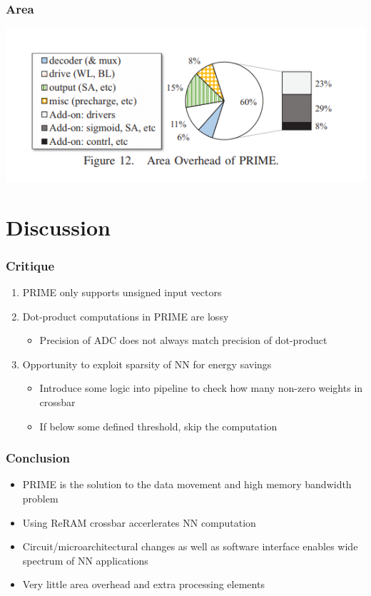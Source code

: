 \documentclass[hyperref={colorlinks}]{beamer}
\begin{document}
\begin{frame}
	\frametitle{Area}
	\includegraphics[scale=0.5, center]{area.png}	
\end{frame}

\section{Discussion}
\begin{frame}
	\frametitle{Critique}
	\begin{enumerate}
		\item PRIME only supports unsigned input vectors
		\item Dot-product computations in PRIME are lossy
		\begin{itemize}
			\item Precision of ADC does not always match precision of dot-product
		\end{itemize}
		\item Opportunity to exploit sparsity of NN for energy savings
		\begin{itemize}
			\item Introduce some logic into pipeline to check how many non-zero weights in crossbar
			\item If below some defined threshold, skip the computation
		\end{itemize}
	\end{enumerate}
\end{frame}
\begin{frame}
	\frametitle{Conclusion}
	\begin{itemize}
		\item PRIME is the solution to the data movement and high memory bandwidth problem
		\item Using ReRAM crossbar accerlerates NN computation
		\item Circuit/microarchitectural changes as well as software interface enables wide spectrum of NN applications
		\item Very little area overhead and extra processing elements
	\end{itemize}
\end{frame}
\end{document}
